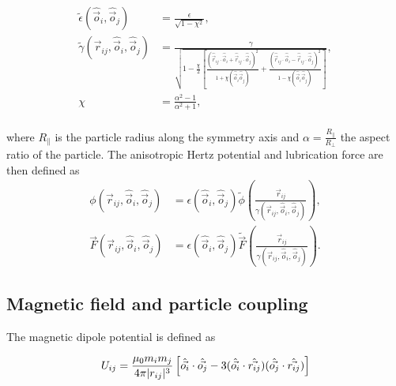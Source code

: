\begin{equation}
    \begin{split}
    \tilde\epsilon\left(\hat{\vec{o}}_i, \hat{\vec{o}}_j\right) &= \frac{{\epsilon}}{\sqrt{1-\chi^2}} , \\
    \tilde\gamma\left(\vec{r}_{ij}, \hat{\vec{o}}_i, \hat{\vec{o}}_j\right) &= \frac{{\gamma}}{\sqrt{1-\frac{\chi}{2}\left[ \frac{\left(\hat{\vec{r}}_{ij}\cdot\hat{\vec{o}}_i+\hat{\vec{r}}_{ij}\cdot\hat{\vec{o}}_j\right)^2}{1+\chi\left(\hat{\vec{o}}_i\hat{\vec{o}}_j\right)} + \frac{\left(\hat{\vec{r}}_{ij}\cdot\hat{\vec{o}}_i-\hat{\vec{r}}_{ij}\cdot\hat{\vec{o}}_j\right)^2}{1-\chi\left(\hat{\vec{o}}_i\hat{\vec{o}}_j\right)} \right] }} , \\
    \chi &= \frac{\alpha^2-1}{\alpha^2+1} , \\
    \end{split}
\end{equation}

where $R_{\parallel}$ is the particle radius along the
symmetry axis and $\alpha=\frac{R_{\parallel}}{R_{\perp}}$ the aspect
ratio of the particle. The anisotropic Hertz potential and lubrication
force are then defined as
%
\begin{equation}
    \begin{split}
    \phi\left(\vec{r}_{ij}, \hat{\vec{o}}_i, \hat{\vec{o}}_j\right) &= \epsilon\left(\hat{\vec{o}}_i, \hat{\vec{o}}_j\right) \tilde{\phi}\left(\frac{\vec{r}_{ij}}{\gamma\left(\vec{r}_{ij}, \hat{\vec{o}}_i, \hat{\vec{o}}_j\right)} \right) , \\
    \vec{F}\left(\vec{r}_{ij}, \hat{\vec{o}}_i, \hat{\vec{o}}_j\right) &= \epsilon\left(\hat{\vec{o}}_i, \hat{\vec{o}}_j\right) \tilde{\vec{F}}\left(\frac{\vec{r}_{ij}}{\gamma\left(\vec{r}_{ij}, \hat{\vec{o}}_i, \hat{\vec{o}}_j\right)} \right) .
    \end{split}
\end{equation}

\subsection{Magnetic field and particle coupling}
\label{section:lbm_colloids_magnetics}

The magnetic dipole potential is defined as

\begin{equation}
    U_{ij} = \frac{\mu_0 m_i m_j}{4\pi |r_{ij}|^{3}} \left[ \Hat{\vec{o_i}}\cdot \Hat{\vec{o_j}} - 
    3(\Hat{\vec{o_i}} \cdot \Hat{\vec{r_{ij}}})(\Hat{\vec{o_j}} \cdot \Hat{\vec{r_{ij}}}) \right]
    \label{eq:magnet_potential}
\end{equation}

